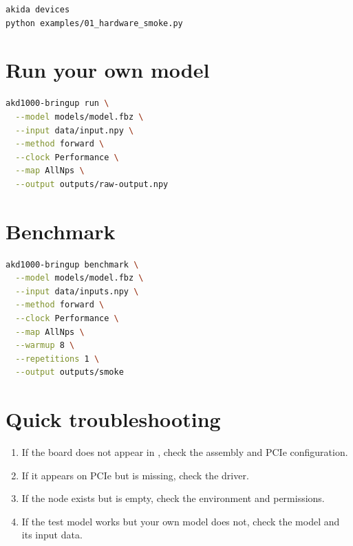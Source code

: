 \begin{lstlisting}[language=bash]
akida devices
python examples/01_hardware_smoke.py
\end{lstlisting}

\section{Run your own model}

\begin{lstlisting}[language=bash]
akd1000-bringup run \
  --model models/model.fbz \
  --input data/input.npy \
  --method forward \
  --clock Performance \
  --map AllNps \
  --output outputs/raw-output.npy
\end{lstlisting}

\section{Benchmark}

\begin{lstlisting}[language=bash]
akd1000-bringup benchmark \
  --model models/model.fbz \
  --input data/inputs.npy \
  --method forward \
  --clock Performance \
  --map AllNps \
  --warmup 8 \
  --repetitions 1 \
  --output outputs/smoke
\end{lstlisting}

\section{Quick troubleshooting}

\begin{enumerate}
  \item If the board does not appear in , check the assembly and PCIe configuration.
  \item If it appears on PCIe but  is missing, check the driver.
  \item If the node exists but  is empty, check the environment and permissions.
  \item If the test model works but your own model does not, check the model and its input data.
\end{enumerate}

